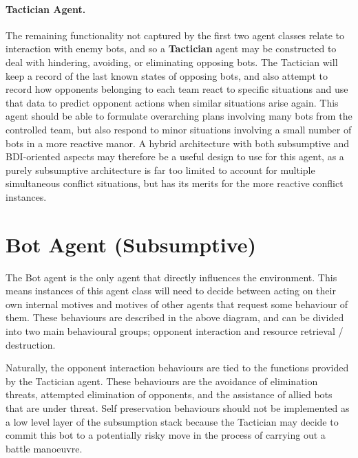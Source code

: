 \documentclass[a4paper,10pt]{article}
\begin{document}
\paragraph{Tactician Agent.}
The remaining functionality not captured by the first two agent classes relate to interaction with enemy bots, and so a \textbf{Tactician} agent may be constructed to deal with hindering, avoiding, or eliminating opposing bots. The Tactician will keep a record of the last known states of opposing bots, and also attempt to record how opponents belonging to each team react to specific situations and use that data to predict opponent actions when similar situations arise again. This agent should be able to formulate overarching plans involving many bots from the controlled team, but also respond to minor situations involving a small number of bots in a more reactive manor. A hybrid architecture with both subsumptive and BDI-oriented aspects may therefore be a useful design to use for this agent, as a purely subsumptive architecture is far too limited to account for multiple simultaneous conflict situations, but has its merits for the more reactive conflict instances.

\section{Bot Agent (Subsumptive)}

The Bot agent is the only agent that directly influences the environment. This means instances of this agent class will need to decide between acting on their own internal motives and motives of other agents that request some behaviour of them. These behaviours are described in the above diagram, and can be divided into two main behavioural groups; opponent interaction and resource retrieval / destruction.

Naturally, the opponent interaction behaviours are tied to the functions provided by the Tactician agent. These behaviours are the avoidance of elimination threats, attempted elimination of opponents, and the assistance of allied bots that are under threat. Self preservation behaviours should not be implemented as a low level layer of the subsumption stack because the Tactician may decide to commit this bot to a potentially risky move in the process of carrying out a battle manoeuvre.
\end{document}
